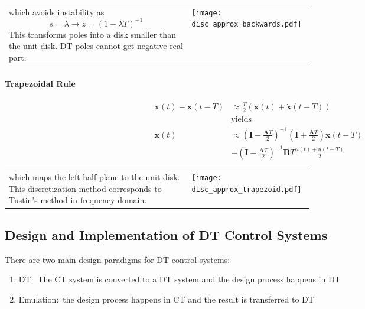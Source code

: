 \begin{tabularx}{\linewidth}{@{}m{0.6\linewidth}X@{}}
    which avoids instability as
    \begin{equation*}
        s=\lambda \rightarrow z={(1-\lambda T)}^{-1}
    \end{equation*}
    This transforms poles into a disk smaller than the unit disk. DT poles cannot get negative real part.
     &
    \texttt{[image: disc\_approx\_backwards.pdf]}
\end{tabularx}

\paragraph{Trapezoidal Rule}\label{disc::trapezoid}
\noindent\begin{align*}
    \mathbf{x}(t)-\mathbf{x}(t-T) & \approx \frac T2\left(\dot{\mathbf{x}}(t)+\dot{\mathbf{x}}(t-T)\right)                                                  \\
                                  & \text{yields}                                                                                                           \\
    \mathbf{x}(t)                 & \approx{\left(\mathbf{I}-\frac{\mathbf{A}T}{2}\right)}^{-1}\left(\mathbf{I}+\frac{\mathbf{A}T}{2}\right)\mathbf{x}(t-T) \\
                                  & +{\left(\mathbf{I}-\frac{\mathbf{A}T}{2}\right)}^{-1}\mathbf{B}T\frac{u(t)+u(t-T)}2
\end{align*}

\begin{tabularx}{\linewidth}{@{}m{0.6\linewidth}X@{}}
    which maps the left half plane to the unit disk. This discretization method corresponds to Tustin's method in frequency domain.
     &
    \texttt{[image: disc\_approx\_trapezoid.pdf]}
\end{tabularx}

\subsection{Design and Implementation of DT Control Systems}
There are two main design paradigms for DT control systems:
\begin{enumerate}
    \item DT:\ The CT system is converted to a DT system and the design process happens in DT
    \item Emulation:\ the design process happens in CT and the result is transferred to DT
\end{enumerate}

